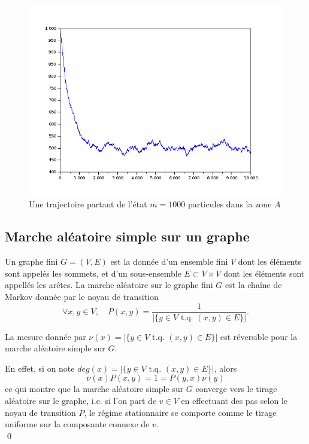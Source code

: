 \begin{figure}[h]\centering
\includegraphics[scale=0.4]{Ehrenfest.png}
\caption{Une trajectoire partant de l'état $m=1000$ particules dans la zone $A$}
\label{fig:Ehrenfest}
\end{figure}

\subsection{Marche aléatoire simple sur un graphe}

\begin{definition}
Un graphe fini $G=(V,E)$ est la donnée d'un ensemble fini $V$ dont les éléments sont appelés les sommets, et d'un sous-ensemble $E\subset V\times V$ dont les éléments sont appellés les arêtes. La marche aléatoire sur le graphe fini $G$ est la chaîne de Markov donnée par le noyau de transition 
\[\forall x,y\in V,\quad P(x,y) = \frac{1}{|\{ y \in V \text{ t.q. } (x,y)\in E\}|}.\]
\end{definition}

\begin{prop}
La mesure donnée par $\nu(x)= |\{ y \in V \text{ t.q. } (x,y)\in E\}|$ est réversible pour la marche aléatoire simple sur $G$.
\end{prop}

\begin{dem}
En effet, si on note $deg(x) =|\{ y \in V \text{ t.q. } (x,y)\in E\}|$, alors 
\[\nu(x) P(x,y) = 1 = P(y,x)\nu(y)\]
ce qui montre que la marche aléatoire simple sur $G$ converge vers le tirage aléatoire sur le graphe, i.e. si l'on part de $v\in V$ en effectuant des pas selon le noyau de transition $P$, le régime stationnaire se comporte comme le tirage uniforme sur la composante connexe de $v$.\\
\qed
\end{dem}

